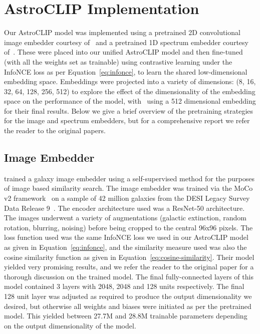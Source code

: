 
\section{AstroCLIP Implementation}\label{sec:astroclip-implementation}
Our AstroCLIP model was implemented using a pretrained 2D convolutional image embedder courtesy of~\cite{stein2021}
and a pretrained 1D spectrum embedder courtesy of~\cite{liang2023}.
These were placed into our unified AstroCLIP model and then fine-tuned (with all the weights set as trainable) using
contrastive learning under the InfoNCE loss as per Equation~\eqref{eq:infonce}, to learn the shared low-dimensional
embedding space.
Embeddings were projected into a variety of dimensions: (8, 16, 32, 64, 128, 256, 512) to explore the effect of the
dimensionality of the embedding space on the performance of the model, with~\cite{astroclip} using a 512 dimensional
embedding for their final results.
Below we give a brief overview of the pretraining strategies for the image and spectrum embedders, but for a
comprehensive report we refer the reader to the original papers.

\subsection{Image Embedder}\label{subsec:image-embedder}
\cite{stein2021} trained a galaxy image embedder using a self-supervised method for the purposes of image based similarity search.
The image embedder was trained via the MoCo v2 framework~\citep{moco2020, mocov22020} on a sample of 42 million galaxies
from the DESI Legacy Survey Data Release 9~\citep{desilegacy2018}.
The encoder architecture used was a ResNet-50 architecture.
The images underwent a variety of augmentations (galactic extinction, random rotation, blurring, noising) before
being cropped to the central 96x96 pixels.
The loss function used was the same InfoNCE loss we used in our AstroCLIP model as given in Equation~\eqref{eq:infonce},
and the similarity measure used was also the cosine similarity function as given in Equation~\eqref{eq:cosine-similarity}.
Their model yielded very promising results, and we refer the reader to the original paper for a thorough discussion
on the trained model.
The final fully-connected layers of this model contained 3 layers with 2048, 2048 and 128 units respectively.
The final 128 unit layer was adjusted as required to produce the output dimensionality we desired, but otherwise all
weights and biases were initiated as per the pretrained model.
This yielded between 27.7M and 28.8M trainable parameters depending on the output dimensionality of the model.

